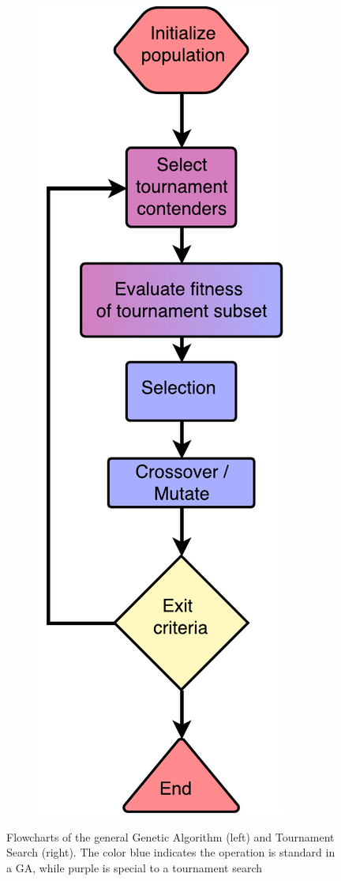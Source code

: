 \begin{figure}[h]
\begin{subfigure}[h]{0.25\linewidth}
    \end{subfigure}
    \hspace{0.25\textwidth}
    \begin{subfigure}[h]{0.25\linewidth}
        \includegraphics[width=\linewidth]{Chapters/2.Background/figures/tournamentsearch_flowchart.pdf}
    \end{subfigure}
    \caption{Flowcharts of the general Genetic Algorithm (left) and Tournament Search (right). The color blue indicates the operation is standard in a GA, while purple is special to a tournament search}
    \label{fig:algorithmflowcharts}
\end{figure}

